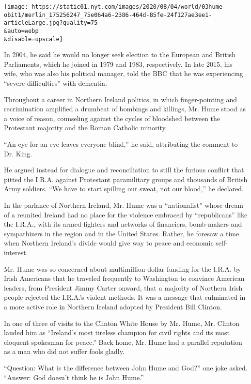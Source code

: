 \texttt{[image: https://static01.nyt.com/images/2020/08/04/world/03hume-obit1/merlin\_175256247\_75e064a6-2386-464d-85fe-24f127ae3ee1-articleLarge.jpg?quality=75\\\&auto=webp\\\&disable=upscale]}

In 2004, he said he would no longer seek election to the European and
British Parliaments, which he joined in 1979 and 1983, respectively. In
late 2015, his wife, who was also his political manager, told the BBC
that he was experiencing ``severe difficulties'' with dementia.

Throughout a career in Northern Ireland politics, in which
finger-pointing and recrimination amplified a drumbeat of bombings and
killings, Mr. Hume stood as a voice of reason, counseling against the
cycles of bloodshed between the Protestant majority and the Roman
Catholic minority.

``An eye for an eye leaves everyone blind,'' he said, attributing the
comment to Dr. King.

He argued instead for dialogue and reconciliation to still the furious
conflict that pitted the I.R.A. against Protestant paramilitary groups
and thousands of British Army soldiers. ``We have to start spilling our
sweat, not our blood,'' he declared.

In the parlance of Northern Ireland, Mr. Hume was a ``nationalist''
whose dream of a reunited Ireland had no place for the violence embraced
by ``republicans'' like the I.R.A., with its armed fighters and networks
of financiers, bomb-makers and sympathizers in the region and in the
United States. Rather, he foresaw a time when Northern Ireland's divide
would give way to peace and economic self-interest.

Mr. Hume was so concerned about multimillion-dollar funding for the
I.R.A. by Irish Americans that he traveled frequently to Washington to
convince American leaders, from President Jimmy Carter onward, that a
majority of Northern Irish people rejected the I.R.A.'s violent methods.
It was a message that culminated in a more active role in Northern
Ireland adopted by President Bill Clinton.

In one of three of visits to the Clinton White House by Mr. Hume, Mr.
Clinton lauded him as ``Ireland's most tireless champion for civil
rights and its most eloquent spokesman for peace.'' Back home, Mr. Hume
had a parallel reputation as a man who did not suffer fools gladly.

``Question: What is the difference between John Hume and God?'' one joke
asked. ``Answer: God doesn't think he is John Hume.''

